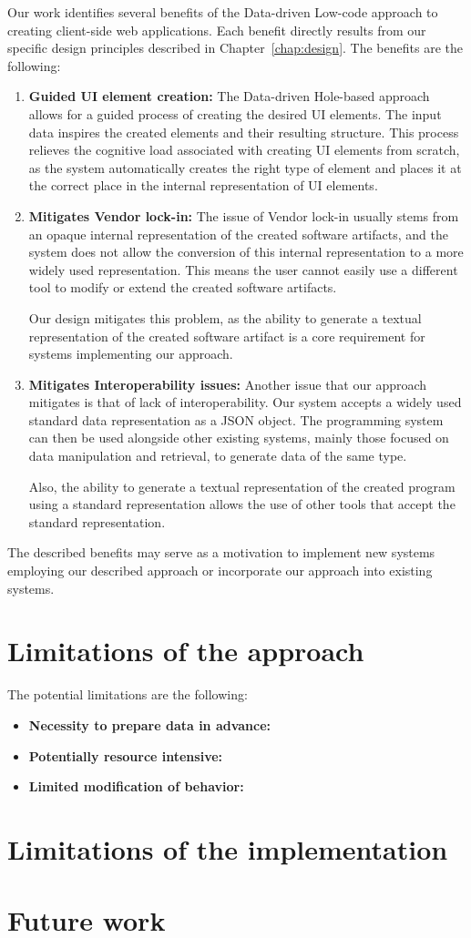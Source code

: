 Our work identifies several benefits of the Data-driven Low-code approach to creating client-side web applications.
Each benefit directly results from our specific design principles described in Chapter~\ref{chap:design}.
The benefits are the following:
\begin{enumerate}
	\item \textbf{Guided UI element creation:} The Data-driven Hole-based approach allows for a guided process of creating the desired UI elements.
	      The input data inspires the created elements and their resulting structure.
	      This process relieves the cognitive load associated with creating UI elements from scratch, as the system automatically creates the right type
	      of element and places it at the correct place in the internal representation of UI elements.

	\item \textbf{Mitigates Vendor lock-in:} The issue of Vendor lock-in usually stems from an opaque internal representation of the created software artifacts,
	      and the system does not allow the conversion of this internal representation to a more widely used representation.
	      This means the user cannot easily use a different tool to modify or extend the created software artifacts.

	      Our design mitigates this problem, as the ability to generate a textual representation of the created software artifact is a core requirement
	      for systems implementing our approach.
	\item \textbf{Mitigates Interoperability issues:} Another issue that our approach mitigates is that of lack of interoperability.
	      Our system accepts a widely used standard data representation as a JSON object.
	      The programming system can then be used alongside other existing systems, mainly those focused on data manipulation and retrieval, to generate data of the same type.

	      Also, the ability to generate a textual representation of the created program using a standard representation allows the use of other tools that accept the standard representation.
\end{enumerate}

The described benefits may serve as a motivation to implement new systems employing our described approach or incorporate our approach into existing systems.

\section{Limitations of the approach}

The potential limitations are the following:
\begin{itemize}
	\item \textbf{Necessity to prepare data in advance:}
	\item \textbf{Potentially resource intensive:}
	\item \textbf{Limited modification of behavior:}
\end{itemize}

\section{Limitations of the implementation}

\section{Future work}

